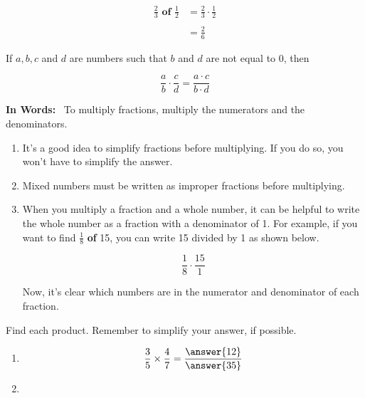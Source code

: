 \documentclass{ximera}[font=12pt]
\begin{document}
\begin{align*}
  \frac{2}{3} \textbf{ of } \frac{1}{2} &= \frac{2}{3} \cdot \frac{1}{2} \\
  & \\
  &= \frac{2}{6}
\end{align*}

\begin{procedure}

If $a, b, c$ and $d$ are numbers such that $b$ and $d$ are not equal to 0, then

\[ \frac{a}{b} \cdot \frac{c}{d} = \frac{a \cdot c}{b \cdot d} \]


\textbf{In Words:} \ To multiply fractions, multiply the numerators and the denominators.

\end{procedure}

\begin{remark}
\begin{enumerate}
\item It's a good idea to simplify fractions before multiplying.  If you do so, you
won't have to simplify the answer.

\item Mixed numbers must be written as improper fractions before multiplying.

\item When you multiply a fraction and a whole number, it can be helpful to write the whole
number as a fraction with a denominator of 1.  For example, if you want to find $\textstyle \frac{1}{8}$ \textbf{of} 15, you can write 15
divided by 1 as shown below.

\[ \frac{1}{8} \cdot \frac{15}{1} \]

Now, it's clear which numbers are in the numerator and denominator of each fraction.

\end{enumerate}
\end{remark}

\begin{problem}
Find each product.  Remember to simplify your answer, if possible.

\begin{enumerate}
\item[(a)]  \[ \frac{3}{5} \times \frac{4}{7} = \frac{\answer{12}}{\answer{35}} \]
\item[] 
\end{enumerate}

\end{problem}
\end{document}
